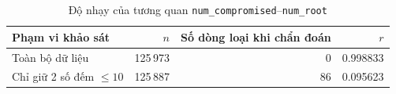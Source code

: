 \begin{table}[htbp]
\centering
\caption{Độ nhạy của tương quan \texttt{num\_compromised}--\texttt{num\_root}}
\label{tab:pearson-root-sensitivity}
\small
\begin{tabular}{lrrr}
\toprule
Phạm vi khảo sát & $n$ & Số dòng loại khi chẩn đoán & $r$\\
\midrule
Toàn bộ dữ liệu & 125\,973 & 0 & 0.998833 \\
Chỉ giữ 2 số đếm $\leq 10$ & 125\,887 & 86 & 0.095623 \\
\bottomrule
\end{tabular}
\end{table}
